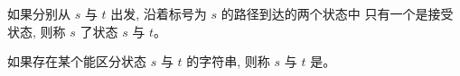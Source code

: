 \begin{frame}{}
  \begin{definition}
	如果分别从 $s$ 与 $t$ 出发, 沿着标号为 $s$ 的路径到达的两个状态中
	只有一个是接受状态, 则称 $s$ 了状态 $s$ 与 $t$。
  \end{definition}

  \pause
  \vspace{1.00cm}
  \begin{definition}
	如果存在某个能区分状态 $s$ 与 $t$ 的字符串,
	则称 $s$ 与 $t$ 是。
  \end{definition}
\end{frame}
